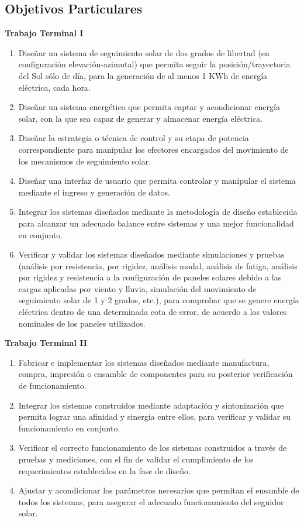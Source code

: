 \subsection{Objetivos Particulares}
\textbf{Trabajo Terminal I}
\begin{enumerate}
	\item Diseñar un sistema de seguimiento solar de dos grados de libertad (en configuración elevación-azimutal) que permita seguir la posición/trayectoria del Sol sólo de día, para la generación de al menos 1 KWh de energía eléctrica, cada hora.
	\item Diseñar un sistema energético que permita captar y acondicionar energía solar, con la que sea capaz de generar y almacenar energía eléctrica.
	\item Diseñar la estrategia o técnica de control y su etapa de potencia correspondiente para manipular los efectores encargados del movimiento de los mecanismos de seguimiento solar.
	\item Diseñar una interfaz de usuario que permita controlar y manipular el sistema mediante el ingreso y generación de datos.
	\item Integrar los sistemas diseñados mediante la metodología de diseño establecida para alcanzar un adecuado balance entre sistemas y una mejor funcionalidad en conjunto.
	\item Verificar y validar los sistemas diseñados mediante simulaciones y pruebas (análisis por resistencia, por rigidez, análisis modal, análisis de fatiga, análisis por rigidez y resistencia a la configuración de paneles solares debido a las cargas aplicadas por viento y lluvia, simulación del movimiento de seguimiento solar de 1 y 2 grados, etc.), para comprobar que se genere energía eléctrica dentro de una determinada cota de error, de acuerdo a los valores nominales de los paneles utilizados.
\end{enumerate} 
\newpage
\textbf{Trabajo Terminal II}
\begin{enumerate}
	\item Fabricar e implementar los sistemas diseñados mediante manufactura, compra, impresión o ensamble de componentes para su posterior verificación de funcionamiento.
	\item Integrar los sistemas construidos mediante adaptación y sintonización que permita lograr una afinidad y sinergia entre ellos, para verificar y validar su funcionamiento en conjunto.
	\item Verificar el correcto funcionamiento de los sistemas construidos a través de pruebas y mediciones, con el fin de validar el cumplimiento de los requerimientos establecidos en la fase de diseño.
	\item Ajustar y acondicionar los parámetros necesarios que permitan el ensamble de todos los sistemas, para asegurar el adecuado funcionamiento del seguidor solar.
\end{enumerate}

